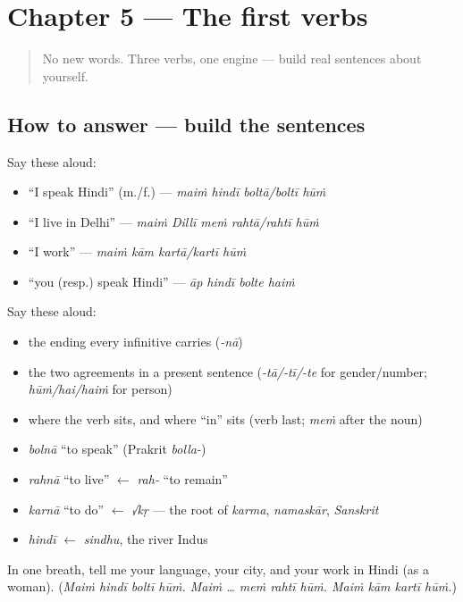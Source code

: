 \section[Practice]{Chapter 5 — The first verbs}

\label{lesson:HI-C05-practice}



\begin{quote}
No new words. Three verbs, one engine — build real sentences about yourself.
\end{quote}

\subsection*{How to answer — build the sentences}
Say these aloud:

\begin{itemize}
\raggedright
  \item \textquotedblleft{}I speak Hindi\textquotedblright{} (m./f.) — \emph{maiṁ hindī boltā/boltī hūṁ}
  \item \textquotedblleft{}I live in Delhi\textquotedblright{} — \emph{maiṁ Dillī meṁ rahtā/rahtī hūṁ}
  \item \textquotedblleft{}I work\textquotedblright{} — \emph{maiṁ kām kartā/kartī hūṁ}
  \item \textquotedblleft{}you (resp.) speak Hindi\textquotedblright{} — \emph{āp hindī bolte haiṁ}
\end{itemize}

\begin{grammarlens}[title={Grammar lens — the engine}]
Say these aloud:

\begin{itemize}
\raggedright
  \item the ending every infinitive carries (\emph{-nā})
  \item the two agreements in a present sentence (\emph{-tā/-tī/-te} for gender/number; \emph{hūṁ/hai/haiṁ} for person)
  \item where the verb sits, and where \textquotedblleft{}in\textquotedblright{} sits (verb last; \emph{meṁ} after the noun)
\end{itemize}
\end{grammarlens}

\begin{grammarlens}[title={What you've built — roots you now carry}]
\begin{itemize}
\raggedright
  \item \emph{bolnā} \textquotedblleft{}to speak\textquotedblright{} (Prakrit \emph{bolla-})
  \item \emph{rahnā} \textquotedblleft{}to live\textquotedblright{} $\leftarrow$ \emph{rah-} \textquotedblleft{}to remain\textquotedblright{}
  \item \emph{karnā} \textquotedblleft{}to do\textquotedblright{} $\leftarrow$ \emph{√kṛ} — the root of \emph{karma}, \emph{namaskār}, \emph{Sanskrit}
  \item \emph{hindī} $\leftarrow$ \emph{sindhu}, the river Indus
\end{itemize}
\end{grammarlens}

\begin{tcolorbox}[breakable,colback=teal!4,colframe=teal!35!black,title={Before you move on}]
In one breath, tell me your language, your city, and your work in Hindi (as a woman). (\emph{Maiṁ hindī boltī hūṁ. Maiṁ … meṁ rahtī hūṁ. Maiṁ kām kartī hūṁ.})
\end{tcolorbox}
